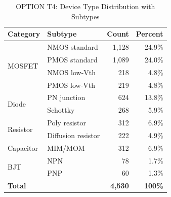 \documentclass[conference]{IEEEtran}
\begin{document}
\begin{table}[!t]
\caption{OPTION T4: Device Type Distribution with Subtypes}
\label{tab:device_detailed}
\centering
\renewcommand{\arraystretch}{1.2}
\begin{tabular}{@{}llrr@{}}
\toprule
\textbf{Category} & \textbf{Subtype} & \textbf{Count} & \textbf{Percent} \\
\midrule
\multirow{4}{*}{MOSFET} & NMOS standard & 1,128 & 24.9\% \\
 & PMOS standard & 1,089 & 24.0\% \\
 & NMOS low-Vth & 218 & 4.8\% \\
 & PMOS low-Vth & 219 & 4.8\% \\
\midrule
\multirow{2}{*}{Diode} & PN junction & 624 & 13.8\% \\
 & Schottky & 268 & 5.9\% \\
\midrule
\multirow{2}{*}{Resistor} & Poly resistor & 312 & 6.9\% \\
 & Diffusion resistor & 222 & 4.9\% \\
\midrule
Capacitor & MIM/MOM & 312 & 6.9\% \\
\midrule
\multirow{2}{*}{BJT} & NPN & 78 & 1.7\% \\
 & PNP & 60 & 1.3\% \\
\midrule
\textbf{Total} & & \textbf{4,530} & \textbf{100\%} \\
\bottomrule
\end{tabular}
\end{table}
\end{document}

